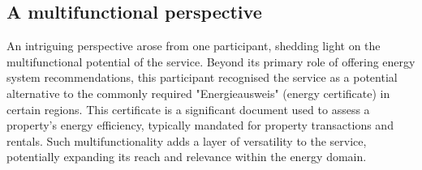 \subsection{A multifunctional perspective}

An intriguing perspective arose from one participant, shedding light on the multifunctional potential of the service. 
Beyond its primary role of offering energy system recommendations, this participant recognised the service as a potential alternative to the commonly required "Energieausweis" (energy certificate) \cite{verbraucherzentrale} in certain regions. 
This certificate is a significant document used to assess a property's energy efficiency, typically mandated for property transactions and rentals.
Such multifunctionality adds a layer of versatility to the service, potentially expanding its reach and relevance within the energy domain.